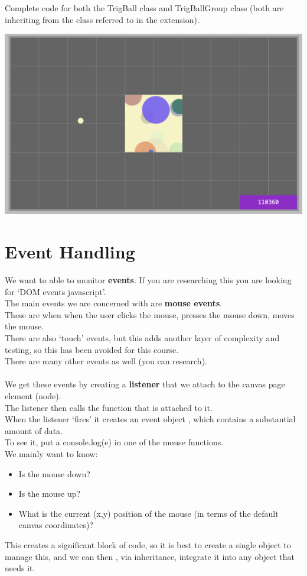\documentclass[a4paper,12pt]{article}
\begin{document}
\vspace{1cm}
Complete code for both the TrigBall class and TrigBallGroup class (both are inheriting from the class referred to in the extension).

\begin{center}
	\includegraphics[width=18cm, angle=0, origin=c]{animation_frame_interpolation/trig_balls.png}
\end{center}



\section{Event Handling}
We want to able to monitor \textbf{events}. If you are researching this you are looking for `DOM events javascript'.\\
The main events we are concerned with are \textbf{mouse events}.\\
These are when when the user clicks the mouse, presses the mouse down, moves the mouse.\\
There are also `touch' events, but this adds another layer of complexity and testing, so this has been avoided for this course. \\
There are many other events as well (you can research).\\\\
We get these events by creating a \textbf{listener} that we attach to the canvas page element (node).\\
The listener then calls the function that is attached to it.\\
When the listener `fires' it creates an event object , which contains a substantial amount of data.\\
To see it, put a console.log(e) in one of the mouse functions.\\
We mainly want to know:
\begin{itemize}
	\item Is the mouse down?
	\item Is the mouse up?
	\item What is the current (x,y) position of the mouse (in terms of the default canvas coordinates)?
\end{itemize}
This creates a significant block of code, so it is best to create a single object to manage this, and we can then , via inheritance, integrate it into any object that needs it.
\end{document}
